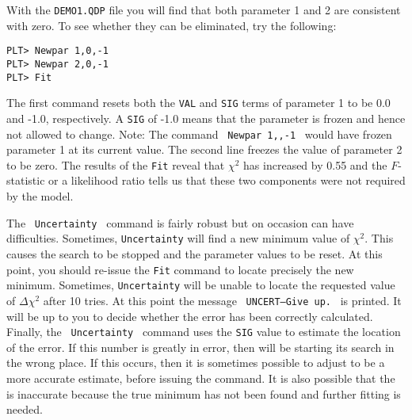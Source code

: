 With the {\tt DEMO1.QDP} file you will find
that both parameter 1 and 2 are consistent with zero.
To see whether they can be eliminated, try the following:
\begin{verbatim}
PLT> Newpar 1,0,-1
PLT> Newpar 2,0,-1
PLT> Fit
\end{verbatim}
The first command resets both the {\tt VAL} and {\tt SIG} terms
of parameter 1 to be 0.0 and -1.0, respectively.
A {\tt SIG} of -1.0 means that the parameter is frozen
and hence not allowed to change.
Note: The command \, {\tt Newpar~1,,-1} \,
would have frozen parameter 1 at its current value.
The second line freezes the value of parameter 2 to be zero.
The results of the {\tt Fit} reveal that $\chi^2$
has increased by 0.55 and the $F$-statistic
or a likelihood ratio tells us
that these two components were not required by the model.

The \, {\tt Uncertainty} \, command is fairly robust
but on occasion can have difficulties.
Sometimes, {\tt Uncertainty} will find a new minimum value of $\chi^2$.
This causes the search to be stopped
and the parameter values to be reset.
At this point, you should re-issue the {\tt Fit} command
to locate precisely the new minimum.
Sometimes, {\tt Uncertainty} will be unable
to locate the requested value of $\Delta$$\chi^2$ after 10 tries.
At this point the message \, {\tt UNCERT--Give up.} \, is printed.
It will be up to you to decide whether the error has been correctly calculated.
Finally, the \, {\tt Uncertainty} \, command
uses the {\tt SIG} value to estimate the location of the error.
If this number is greatly in error,
then \verb@Uncertainty@ will be starting its search in the wrong place.
If this occurs, then it is sometimes possible to adjust \verb@SIG@
to be a more accurate estimate,
before issuing the \verb@Uncertainty@ command.
It is also possible that the \verb@SIG@ is inaccurate because the
true minimum has not been found and further fitting is needed.
